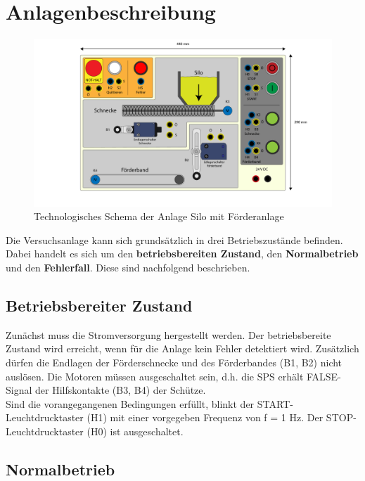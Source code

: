 \section{Anlagenbeschreibung}

\begin{figure}[H]
   \centering
   \includegraphics[width=1.0\textwidth]{Bilder/Aufbauplan_Vorderseite.pdf}
   \caption[Technologieschema]{Technologisches Schema der Anlage \glqq Silo mit Förderanlage\grqq{}}
   \label{fig:Bild1}
\end{figure}

Die Versuchsanlage kann sich grundsätzlich in drei Betriebszustände befinden. Dabei handelt es sich um den \textbf{betriebsbereiten Zustand}, den \textbf{Normalbetrieb} und den \textbf{Fehlerfall}. Diese sind nachfolgend beschrieben.

\subsection{Betriebsbereiter Zustand}

Zunächst muss die Stromversorgung hergestellt werden. Der betriebsbereite Zustand wird erreicht, wenn für die Anlage kein Fehler detektiert wird. Zusätzlich dürfen die Endlagen der Förderschnecke und des Förderbandes (B1, B2) nicht auslösen. Die Motoren müssen ausgeschaltet sein, d.h. die SPS erhält FALSE-Signal der Hilfskontakte (B3, B4) der Schütze.\\
Sind die vorangegangenen Bedingungen erfüllt, blinkt der START-Leuchtdrucktaster (H1) mit einer vorgegeben Frequenz von f = 1 Hz. Der STOP-Leuchtdrucktaster (H0) ist ausgeschaltet.

\subsection{Normalbetrieb}

